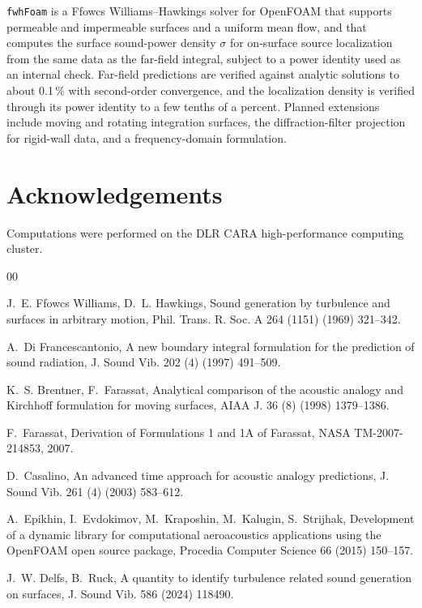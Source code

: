 \documentclass[preprint,12pt,a4paper]{elsarticle}
\begin{document}
\texttt{fwhFoam} is a Ffowcs Williams--Hawkings solver for OpenFOAM that
supports permeable and impermeable surfaces and a uniform mean flow, and that
computes the surface sound-power density $\sigma$ for on-surface source
localization from the same data as the far-field integral, subject to a power
identity used as an internal check. Far-field predictions are verified
against analytic solutions to about 0.1\,\% with second-order convergence,
and the localization density is verified through its power identity to a few
tenths of a percent. Planned extensions include moving and rotating
integration surfaces, the diffraction-filter projection for rigid-wall data,
and a frequency-domain formulation.

\section*{Acknowledgements}

Computations were performed on the DLR CARA high-performance computing
cluster.

\begin{thebibliography}{00}

 J.~E. Ffowcs Williams, D.~L. Hawkings, Sound generation by
turbulence and surfaces in arbitrary motion, Phil. Trans. R. Soc. A 264
(1151) (1969) 321--342.

 A.~Di Francescantonio, A new boundary
integral formulation for the prediction of sound radiation, J. Sound Vib.
202 (4) (1997) 491--509.

 K.~S. Brentner, F.~Farassat, Analytical comparison of
the acoustic analogy and Kirchhoff formulation for moving surfaces, AIAA J.
36 (8) (1998) 1379--1386.

 F.~Farassat, Derivation of Formulations 1 and 1A of
Farassat, NASA TM-2007-214853, 2007.

 D.~Casalino, An advanced time approach for acoustic
analogy predictions, J. Sound Vib. 261 (4) (2003) 583--612.

 A.~Epikhin, I.~Evdokimov, M.~Kraposhin, M.~Kalugin,
S.~Strijhak, Development of a dynamic library for computational aeroacoustics
applications using the OpenFOAM open source package, Procedia Computer
Science 66 (2015) 150--157.

 J.~W. Delfs, B.~Ruck, A quantity to identify turbulence
related sound generation on surfaces, J. Sound Vib. 586 (2024) 118490.

\end{thebibliography}
\end{document}
